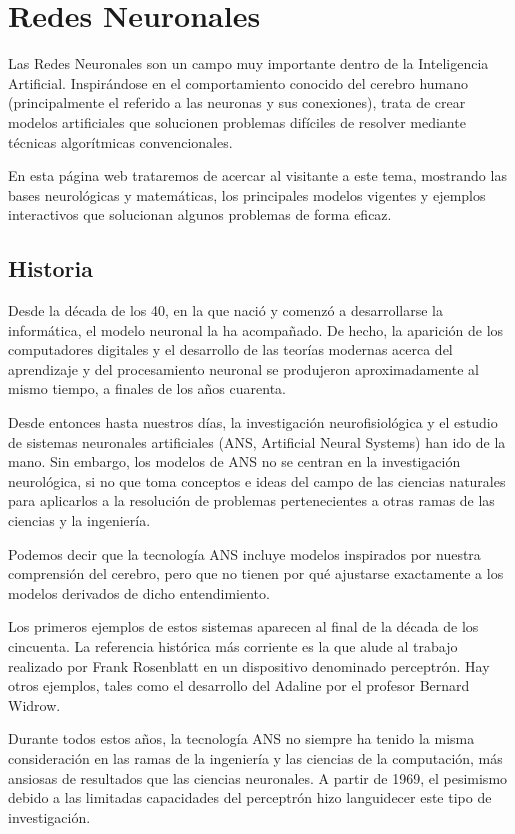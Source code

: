 \documentclass[12pt]{book} %
\begin{document}
\section{Redes Neuronales \label{a-neuronales}}
	Las Redes Neuronales son un campo muy importante dentro de la Inteligencia Artificial. Inspirándose en el comportamiento conocido del cerebro
	humano (principalmente el referido a las neuronas y sus conexiones), trata de crear modelos artificiales que solucionen problemas difíciles de
	resolver mediante técnicas algorítmicas convencionales.  
	
	En esta página web trataremos de acercar al visitante a este tema, mostrando las bases neurológicas y matemáticas, los principales modelos 
	vigentes y ejemplos interactivos que solucionan algunos problemas de forma eficaz.
	
	\subsection{Historia}
		Desde la década de los 40, en la que nació y comenzó a desarrollarse la informática, el modelo neuronal la ha acompañado. De hecho, la
		aparición de los computadores digitales y el desarrollo de las teorías modernas acerca del aprendizaje y del procesamiento neuronal se
		produjeron aproximadamente al mismo tiempo, a finales de los años cuarenta.
		
		Desde entonces hasta nuestros días, la investigación neurofisiológica y el estudio de sistemas neuronales artificiales (ANS, Artificial Neural
		Systems) han ido de la mano. Sin embargo, los modelos de ANS no se centran en la investigación neurológica, si no que toma conceptos e ideas
		del campo de las ciencias naturales para aplicarlos a la resolución de problemas pertenecientes a otras ramas de las ciencias y la ingeniería.
		
		Podemos decir que la tecnología ANS incluye modelos inspirados por nuestra comprensión del cerebro, pero que no tienen por qué ajustarse
		exactamente a los modelos derivados de dicho entendimiento.
		
		Los primeros ejemplos de estos sistemas aparecen al final de la década de los cincuenta. La referencia histórica más corriente es la que 
		alude al trabajo realizado por Frank Rosenblatt en un dispositivo denominado perceptrón. Hay otros ejemplos, tales como el desarrollo del
		Adaline por el profesor Bernard Widrow.
		
		Durante todos estos años, la tecnología ANS no siempre ha tenido la misma consideración en las ramas de la ingeniería y las ciencias de 
		la computación, más ansiosas de resultados que las ciencias neuronales. A partir de 1969, el pesimismo debido a las limitadas capacidades
		del perceptrón hizo languidecer este tipo de investigación.
		
\end{document}
